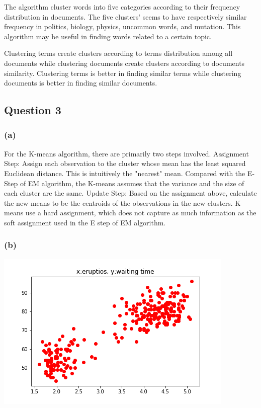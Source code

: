 \documentclass[12pt]{article}
\begin{document}
{\medskip


The algorithm cluster words into five categories according to their frequency distribution in documents. The five clusters' seems to have respectively similar frequency in politics, biology, physics, uncommon words, and mutation. This algorithm may be useful in finding words related to a certain topic.

Clustering terms create clusters according to terms distribution among all documents while clustering documents create clusters according to documents similarity. Clustering terms is better in finding similar terms while clustering documents is better in finding similar documents.

\subsection*{Question 3}
\subsubsection*{(a)}
For the K-means algorithm, there are primarily two steps involved. 
\newline
Assignment Step: Assign each observation to the cluster whose mean has the least squared Euclidean distance. This is intuitively the "nearest" mean. Compared with the E-Step of EM algorithm, the K-means assumes that the variance and the size of each cluster are the same.
\newline
Update Step: Based on the assignment above, calculate the new means to be the centroids of the observations in the new clusters. K-means use a hard assignment, which does not capture as much information as the soft assignment used in the E step of EM algorithm. 

\subsubsection*{(b)}
\begin{center}
\includegraphics[scale=0.8]{P3/data_on_2D_plane.png}
\end{center}

}
\end{document}
